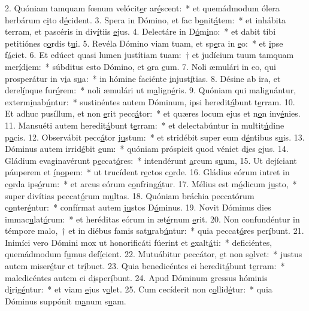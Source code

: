 2. Quóniam tamquam fœnum velócit\uline{e}r ar\uline{é}scent:~* et quemádmodum ólera herbárum c\uline{i}to d\uline{é}cident.
3. Spera in Dómino, et fac b\uline{o}nit\uline{á}tem:~* et inhábita terram, et pascéris in div\uline{í}tiis \uline{e}jus.
4. Delectáre in D\uline{ó}m\uline{i}no:~* et dabit tibi petitiónes c\uline{o}rdis t\uline{u}i.
5. Revéla Dómino viam tuam, et sp\uline{e}ra in \uline{e}o:~* et \uline{i}pse f\uline{á}ciet.
6. Et edúcet quasi lumen justítiam tuam:~† et judícium tuum tamquam mer\uline{í}d\uline{i}em:~* súbditus esto Dómino, et \uline{o}ra \uline{e}um.
7. Noli æmulári in eo, qui prosperátur in v\uline{i}a s\uline{u}a:~* in hómine faciénte \uline{i}njust\uline{í}tias.
8. Désine ab ira, et derel\uline{í}nque fur\uline{ó}rem:~* noli æmulári ut m\uline{a}lign\uline{é}ris.
9. Quóniam qui malignántur, exterm\uline{i}nab\uline{ú}ntur:~* sustinéntes autem Dóminum, ipsi heredit\uline{á}bunt t\uline{e}rram.
10. Et adhuc pusíllum, et non \uline{e}rit pecc\uline{á}tor:~* et quæres locum ejus et n\uline{o}n inv\uline{é}nies.
11. Mansuéti autem heredit\uline{á}bunt t\uline{e}rram:~* et delectabúntur in multit\uline{ú}dine p\uline{a}cis.
12. Observábit pecc\uline{á}tor j\uline{u}stum:~* et stridébit super eum d\uline{é}ntibus s\uline{u}is.
13. Dóminus autem irrid\uline{é}bit \uline{e}um:~* quóniam próspicit quod véniet d\uline{i}es \uline{e}jus.
14. Gládium evaginavérunt p\uline{e}ccat\uline{ó}res:~* intendérunt \uline{a}rcum s\uline{u}um,
15. Ut dejíciant páuperem et \uline{í}n\uline{o}pem:~* ut trucídent r\uline{e}ctos c\uline{o}rde.
16. Gládius eórum intret in c\uline{o}rda ips\uline{ó}rum:~* et arcus eórum c\uline{o}nfring\uline{á}tur.
17. Mélius est m\uline{ó}dicum j\uline{u}sto,~* super divítias peccat\uline{ó}rum m\uline{u}ltas.
18. Quóniam bráchia peccatórum c\uline{o}nter\uline{é}ntur:~* confírmat autem j\uline{u}stos D\uline{ó}minus.
19. Novit Dóminus dies immac\uline{u}lat\uline{ó}rum:~* et heréditas eórum in æt\uline{é}rnum \uline{e}rit.
20. Non confundéntur in témpore malo,~† et in diébus famis sat\uline{u}rab\uline{ú}ntur:~* quia peccat\uline{ó}res per\uline{í}bunt.
21. Inimíci vero Dómini mox ut honorificáti fúerint et \uline{e}xalt\uline{á}ti:~* deficiéntes, quemádmodum f\uline{u}mus def\uline{í}cient.
22. Mutuábitur peccátor, \uline{e}t non s\uline{o}lvet:~* justus autem miser\uline{é}tur et tr\uline{í}buet.
23. Quia benedicéntes ei heredit\uline{á}bunt t\uline{e}rram:~* maledicéntes autem ei d\uline{i}sper\uline{í}bunt.
24. Apud Dóminum gressus hóminis d\uline{i}rig\uline{é}ntur:~* et viam \uline{e}jus v\uline{o}let.
25. Cum cecíderit non c\uline{o}llid\uline{é}tur:~* quia Dóminus suppónit m\uline{a}num s\uline{u}am.
